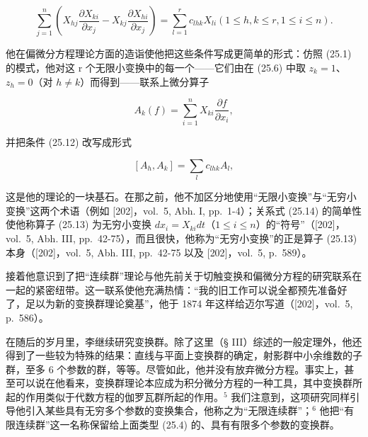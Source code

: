\[
\sum_ {j = 1} ^ {n} \left(X _ {h j} \frac {\partial X _ {k i}}{\partial x _ {j}} - X _ {k j} \frac {\partial X _ {h i}}{\partial x _ {j}}\right) = \sum_ {l = 1} ^ {r} c _ {l h k} X _ {l i} (1 \leq h, k \leq r, 1 \leq i \leq n).\tag{25.12}
\]

他在偏微分方程理论方面的造诣使他把这些条件写成更简单的形式：仿照 (25.1) 的模式，他对这 r 个无限小变换中的每一个——它们由在 (25.6) 中取 \(z_{k}=1\)、\(z_{h}=0\)（对 \(h\neq k\)）而得到——联系上微分算子

\[
A _ {k} (f) = \sum_ {i = 1} ^ {n} X _ {k i} \frac {\partial f}{\partial x _ {i}},\tag{25.13}
\]

并把条件 (25.12) 改写成形式

\[
[ A _ {h}, A _ {k} ] = \sum_ {l} c _ {l h k} A _ {l},\tag{25.14}
\]

这是他的理论的一块基石。在那之前，他不加区分地使用“无限小变换”与“无穷小变换”这两个术语（例如 {[}202{]}，vol.~5, Abh. I, pp.~1-4）；关系式 (25.14) 的简单性使他称算子 (25.13) 为无穷小变换 \(dx_{i} = X_{ki}dt\)（\(1 \leq i \leq n\)）的“符号”（{[}202{]}，vol.~5, Abh. III, pp.~42-75），而且很快，他称为“无穷小变换”的正是算子 (25.13) 本身（{[}202{]}，vol.~5, Abh. III, pp.~42-75 以及 {[}202{]}，vol.~5, p.~589）。

接着他意识到了把“连续群”理论与他先前关于切触变换和偏微分方程的研究联系在一起的紧密纽带。这一联系使他充满热情：“我的旧工作可以说全都预先准备好了，足以为新的变换群理论奠基”，他于 1874 年这样给迈尔写道（{[}202{]}，vol.~5, p.~586）。

在随后的岁月里，李继续研究变换群。除了这里（§ III）综述的一般定理外，他还得到了一些较为特殊的结果：直线与平面上变换群的确定，射影群中小余维数的子群，至多 6 个参数的群，等等。尽管如此，他并没有放弃微分方程。事实上，甚至可以说在他看来，变换群理论本应成为积分微分方程的一种工具，其中变换群所起的作用类似于代数方程的伽罗瓦群所起的作用。\(^{5}\) 我们注意到，这项研究同样引导他引入某些具有无穷多个参数的变换集合，他称之为“无限连续群”；\(^{6}\) 他把“有限连续群”这一名称保留给上面类型 (25.4) 的、具有有限多个参数的变换群。


